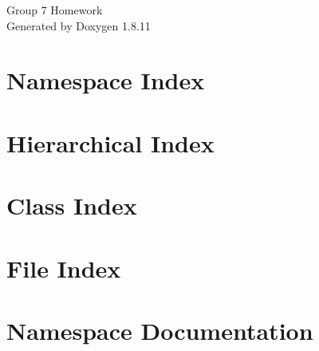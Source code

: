 \documentclass[twoside]{book}
\newcommand{\+}{\discretionary{\mbox{\scriptsize$\hookleftarrow$}}{}{}}
\newcommand{\clearemptydoublepage}{%
  \newpage{\pagestyle{empty}\cleardoublepage}%
}
\begin{document}
\hypersetup{pageanchor=false,
             bookmarksnumbered=true,
             pdfencoding=unicode
            }
\begin{titlepage}
\vspace*{7cm}
\begin{center}%
{\Large Group 7 Homework }\\
\vspace*{1cm}
{\large Generated by Doxygen 1.8.11}\\
\end{center}
\end{titlepage}
\clearemptydoublepage
\tableofcontents
\clearemptydoublepage
{}
\hypersetup{pageanchor=true}

\chapter{Namespace Index}

\chapter{Hierarchical Index}

\chapter{Class Index}

\chapter{File Index}

\chapter{Namespace Documentation}










\end{document}
